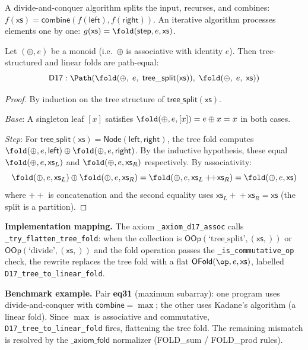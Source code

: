 A divide-and-conquer algorithm splits the input, recurses, and
combines:
$f(\mathsf{xs}) = \mathsf{combine}(f(\mathsf{left}),
f(\mathsf{right}))$.
An iterative algorithm processes elements one by one:
$g(\mathsf{xs}) = \fold(\mathsf{step}, e, \mathsf{xs})$.

\begin{theorem}
\label{thm:d17-assoc}
Let $(\oplus, e)$ be a monoid (i.e.\ $\oplus$ is associative with
identity $e$).  Then tree-structured and linear folds are path-equal:
\[
  \mathsf{D17} : \Path\!\left(
    \fold(\oplus,\; e,\; \mathsf{tree\_split}(\mathsf{xs})),\;
    \fold(\oplus,\; e,\; \mathsf{xs})
  \right)
\]
\end{theorem}

\begin{proof}
By induction on the tree structure of $\mathsf{tree\_split}(\mathsf{xs})$.

\emph{Base}: A singleton leaf $[x]$ satisfies
$\fold(\oplus, e, [x]) = e \oplus x = x$ in both cases.

\emph{Step}: For $\mathsf{tree\_split}(\mathsf{xs}) =
\mathsf{Node}(\mathsf{left}, \mathsf{right})$, the tree fold computes
$\fold(\oplus, e, \mathsf{left}) \oplus
\fold(\oplus, e, \mathsf{right})$.  By the inductive hypothesis,
these equal $\fold(\oplus, e, \mathsf{xs}_L)$ and
$\fold(\oplus, e, \mathsf{xs}_R)$ respectively.  By associativity:
\[
  \fold(\oplus, e, \mathsf{xs}_L) \oplus \fold(\oplus, e, \mathsf{xs}_R)
  = \fold(\oplus, e, \mathsf{xs}_L +\!\!+ \mathsf{xs}_R)
  = \fold(\oplus, e, \mathsf{xs})
\]
where $+\!\!+$ is concatenation and the second equality uses
$\mathsf{xs}_L +\!\!+ \mathsf{xs}_R = \mathsf{xs}$ (the split
is a partition).
\end{proof}

\textbf{Implementation mapping.}
The axiom \texttt{\_axiom\_d17\_assoc} calls
\texttt{\_try\_flatten\_tree\_fold}: when the collection is
$\mathsf{OOp}(\text{`tree\_split'}, (\mathsf{xs},))$ or
$\mathsf{OOp}(\text{`divide'}, (\mathsf{xs},))$ and the fold
operation passes the \texttt{\_is\_commutative\_op} check, the
rewrite replaces the tree fold with a flat
$\mathsf{OFold}(\op, e, \mathsf{xs})$, labelled
\texttt{D17\_tree\_to\_linear\_fold}.

\textbf{Benchmark example.}
Pair \textbf{eq31} (maximum subarray): one program uses
divide-and-conquer with $\mathsf{combine} = \max$; the other uses
Kadane's algorithm (a linear fold).  Since $\max$ is associative and
commutative, \texttt{D17\_tree\_to\_linear\_fold} fires, flattening
the tree fold.  The remaining mismatch is resolved by the
$\mathsf{\_axiom\_fold}$ normalizer (FOLD\_sum / FOLD\_prod rules).

